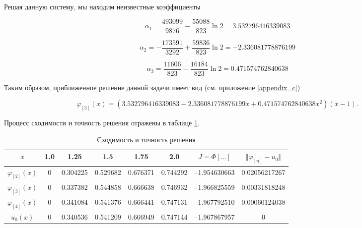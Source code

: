 \documentclass{article}
\begin{document}
\noindent Решая данную систему, мы находим неизвестные коэффициенты

\begin{displaymath}
	\alpha_{1} = \frac{493099}{9876} - \frac{55088}{823}\ln{2} = 3.532796416339083
\end{displaymath}

\begin{displaymath}
	\alpha_{2} = -\frac{173591}{3292} + \frac{59836}{823}\ln{2} = -2.336081778876199
\end{displaymath}

\begin{displaymath}
	\alpha_{3} = \frac{11606}{823} - \frac{16184}{823}\ln{2} = 0.471574762840638
\end{displaymath}

\noindent Таким образом, приближенное решение данной задачи имеет вид (см. приложение \ref{appendix_c})

\begin{displaymath}
	\varphi_{[3]}(x) = (3.532796416339083 - 2.336081778876199x + 0.471574762840638 x^2)(x-1).
\end{displaymath}

Процесс сходимости и точность решения отражены в таблице \ref{table_process_of_convergence_rank_3}.

\begin{table}[!h]
\centering
\begin{tabular}{|c|c|c|c|c|c|c|c|}
	\hline
	$x$ & 1.0 & 1.25 & 1.5 & 1.75 & 2.0 & $J = \Phi[\ldots]$ & $\Vert \varphi_{[n]} - u_{0} \Vert$ \\
	\hline \hline

	$\varphi_{[2]}(x)$ & 0 & 0.304225 & 0.529682 & 0.676371 & 0.744292 & –1.954630663 & 0.02056217267 \\	\hline
	$\varphi_{[3]}(x)$ & 0 & 0.337382 & 0.544858 & 0.666638 & 0.746932 & –1.966825559 & 0.00331818248 \\	\hline
	$\varphi_{[4]}(x)$ & 
0 & 0.341084 & 0.541376 & 0.666441 & 0.747131 & –1.967792510 & 0.00060124038 \\	\hline
	$u_{0}(x)$ & 0 & 0.340536 & 0.541209 & 0.666949 & 0.747144 & –1.967867957 & 0 \\	\hline

\end{tabular}
\caption{Сходимость и точность решения}
\label{table_process_of_convergence_rank_3}
\end{table}

\newpage
\end{document}
